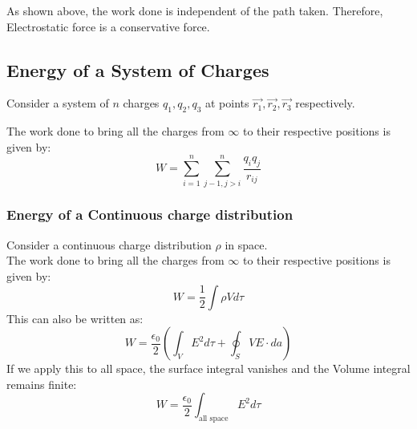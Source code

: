 \documentclass{article}
\begin{document}
As shown above, the work done is independent of the path taken. Therefore, Electrostatic force is a conservative force.

\subsection{Energy of a System of Charges}
Consider a system of $n$ charges $q_1, q_2, q_3$ at points $\vec{r_1}, \vec{r_2}, \vec{r_3}$ respectively.\\

The work done to bring all the charges from $\infty$ to their respective positions is given by:
\[ W = \sum_{i = 1}^{n} \sum_{j-1, j>i}^{n} \frac{q_i q_j}{r_{ij}}  \]

\subsubsection{Energy of a Continuous charge distribution}
Consider a continuous charge distribution $\rho$ in space.\\
The work done to bring all the charges from $\infty$ to their respective positions is given by:\\
\[ W = \frac{1}{2} \int \rho V d\tau \]
This can also be written as:\\
\[ W = \frac{\epsilon_0}{2} \left(\int_{V} E^2 d\tau + \oint_{S} V E \cdot da  \right) \]
If we apply this to all space, the surface integral vanishes and the Volume integral remains finite:
\[ W = \frac{\epsilon_0}{2} \int_{\text{all space}} E^2 d\tau\]
\end{document}
